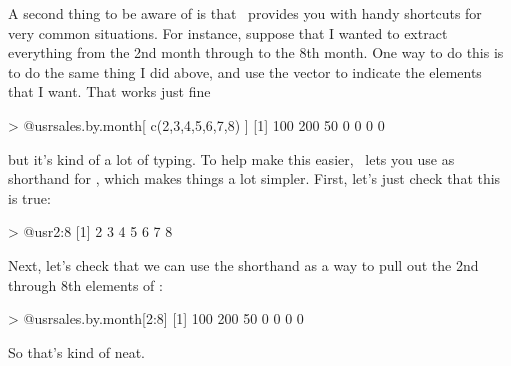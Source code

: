 A second thing to be aware of is that \R\ provides you with handy shortcuts for very common situations. For instance, suppose that I wanted to extract everything from the 2nd month through to the 8th month. One way to do this is to do the same thing I did above, and use the vector  to indicate the elements that I want. That works just fine
\begin{rblock1}
> @usr{sales.by.month[ c(2,3,4,5,6,7,8) ]}
[1] 100 200  50   0   0   0   0
\end{rblock1}
but it's kind of a lot of typing. To help make this easier, \R\ lets you use  as shorthand for , which makes things a lot simpler. First, let's just check that this is true:
\begin{rblock1}
> @usr{2:8}
[1] 2 3 4 5 6 7 8
\end{rblock1}
Next, let's check that we can use the  shorthand as a way to pull out the 2nd through 8th elements of :
\begin{rblock1}
> @usr{sales.by.month[2:8]}
[1] 100 200  50   0   0   0   0
\end{rblock1}
So that's kind of neat.


